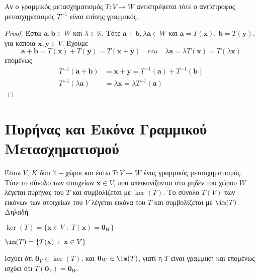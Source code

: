 \begin{prop}
  Αν ο γραμμικός μετασχηματισμός $ T \colon V \to W $ αντιστρέφεται τότε ο αντίστροφος 
  μετασχηματισμός $ T^{-1} $ είναι επίσης γραμμικός.
\end{prop}
\begin{proof}
  Έστω $ \mathbf{a}, \mathbf{b} \in W $ και $ \lambda \in \mathbb{K} $. Τότε 
  $ \mathbf{a} + \mathbf{b}, \lambda \mathbf{a} \in W $ και 
  $ \mathbf{a}= T(\mathbf{x}) $, $ \mathbf{b} = T(\mathbf{y}) $, για κάποια
  $ \mathbf{x}, \mathbf{y} \in V $. 
  Έχουμε
  \begin{equation*}
    \mathbf{a}+ \mathbf{b} = T(\mathbf{x}) + T(\mathbf{y}) = T(\mathbf{x}+ \mathbf{y})
    \quad \text{και} \quad
    \lambda \mathbf{a} = \lambda T(\mathbf{x}) = T(\lambda \mathbf{x})
  \end{equation*}
  επομένως
  \begin{align*}
    T^{-1} (\mathbf{a}+ \mathbf{b}) &= \mathbf{x} + \mathbf{y} = T^{-1} (\mathbf{a}) 
    + T^{-1} (\mathbf{b}) \\
    T^{-1} (\lambda \mathbf{a}) &= \lambda \mathbf{x} = \lambda T^{-1} (\mathbf{a})
   \end{align*} 
\end{proof}


\section{Πυρήνας και Εικόνα Γραμμικού Μετασχηματισμού}

\begin{dfn}
  Έστω $V$, $K$ δυο $ \mathbb{K}- $χώροι και έστω $ T \colon V \to W $ ένας 
  γραμμικός μετασχηματισμός. Τότε 
  το σύνολο των στοιχείων $ \mathbf{x} \in V $, που απεικονίζονται  
  στο μηδέν του χώρου $W$ λέγεται \textcolor{Col1}{πυρήνας} του $T$ και συμβολίζεται με 
  $ \ker(T) $.  Το σύνολο $T(V)$ των εικόνων των στοιχείων του $V$ λέγεται 
  \textcolor{Col1}{εικόνα} του $T$ και συμβολίζεται με $ \im(T) $. Δηλαδή
  \begin{myitemize}
    \item $ \ker(T) = \{ \mathbf{x} \in V \; : \; T(\mathbf{x}) = \mathbf{0}_{W} \} $ 
    \item $ \im(T) = \{ T(\mathbf{x}) \; : \; \mathbf{x} \in V \} $ 
  \end{myitemize}
\end{dfn}

\begin{rem}
  Ισχύει ότι $ \mathbf{0}_{V} \in \ker(T) $, και $ \mathbf{0}_{W} \in \im(T)
  $, γιατί η $T$ είναι γραμμική και επομένως ισχύει ότι 
  $ T(\mathbf{0}_{V}) = \mathbf{0}_{W} $.
\end{rem}

